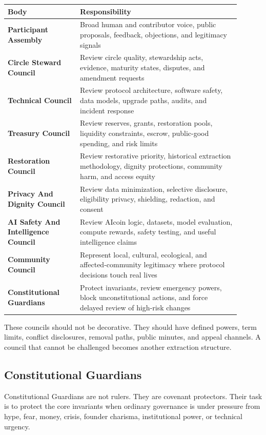 \documentclass[12pt]{article}
\begin{document}
\begin{longtable}{>{\bfseries}p{0.28\linewidth}p{0.62\linewidth}}
\toprule
Body & Responsibility \\
\midrule
Participant Assembly & Broad human and contributor voice, public proposals, feedback, objections, and legitimacy signals \\
Circle Steward Council & Review circle quality, stewardship acts, evidence, maturity states, disputes, and amendment requests \\
Technical Council & Review protocol architecture, software safety, data models, upgrade paths, audits, and incident response \\
Treasury Council & Review reserves, grants, restoration pools, liquidity constraints, escrow, public-good spending, and risk limits \\
Restoration Council & Review restorative priority, historical extraction methodology, dignity protections, community harm, and access equity \\
Privacy And Dignity Council & Review data minimization, selective disclosure, eligibility privacy, shielding, redaction, and consent \\
AI Safety And Intelligence Council & Review AIcoin logic, datasets, model evaluation, compute rewards, safety testing, and useful intelligence claims \\
Community Council & Represent local, cultural, ecological, and affected-community legitimacy where protocol decisions touch real lives \\
Constitutional Guardians & Protect invariants, review emergency powers, block unconstitutional actions, and force delayed review of high-risk changes \\
\bottomrule
\end{longtable}

These councils should not be decorative. They should have defined powers, term limits, conflict disclosures, removal paths, public minutes, and appeal channels. A council that cannot be challenged becomes another extraction structure.

\subsection{Constitutional Guardians}

Constitutional Guardians are not rulers. They are covenant protectors. Their task is to protect the core invariants when ordinary governance is under pressure from hype, fear, money, crisis, founder charisma, institutional power, or technical urgency.
\end{document}
